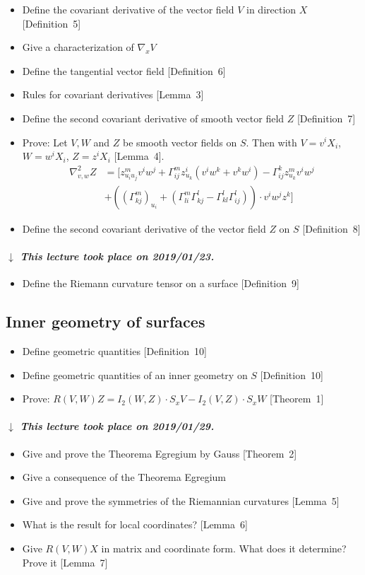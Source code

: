 \documentclass{article}
\numberwithin{lecref}{section}
\newcommand{\dateref}[1]{%
  \begin{mdframed}[backgroundcolor=gray!10,innerbottommargin=0pt,innertopmargin=0pt]
    \paragraph{\textit{$\downarrow$ This lecture took place on #1.}}%
  \end{mdframed}%
}
\begin{document}
\begin{itemize}
  \item Define the covariant derivative of the vector field $V$ in direction $X$ [Definition~5]
  \item Give a characterization of $\nabla_x V$
  \item Define the tangential vector field [Definition~6]
  \item Rules for covariant derivatives [Lemma~3]
  \item Define the second covariant derivative of smooth vector field $Z$ [Definition~7]
  \item Prove: Let $V, W$ and $Z$ be smooth vector fields on $S$. Then with $V = v^i X_i$, $W = w^i X_i$, $Z = z^i X_i$ [Lemma~4].
    \begin{align*}
      \nabla_{v,w}^2 Z &= \big[z_{u_i u_j}^m v^i w^j + \Gamma_{ij}^m z_{u_k}^i (v^i w^k + v^k w^i) - \Gamma_{ij}^k z_{u_k}^m v^i w^j \\
        &+ \left((\Gamma_{kj}^m)_{u_i} + (\Gamma_{li}^m \Gamma_{kj}^l - \Gamma_{kl}^l \Gamma_{ij}^l)\right) \cdot v^i w^j z^k \big]
    \end{align*}
  \item Define the second covariant derivative of the vector field $Z$ on $S$ [Definition~8]
\end{itemize}

\dateref{2019/01/23}

\begin{itemize}
  \item Define the Riemann curvature tensor on a surface [Definition~9] \\
\end{itemize}

\subsection*{Inner geometry of surfaces}

\begin{itemize}
  \item Define geometric quantities [Definition~10]
  \item Define geometric quantities of an inner geometry on $S$ [Definition~10]
  \item Prove: $R(V, W) Z = I_2(W, Z) \cdot S_x V - I_2(V, Z) \cdot S_x W$ [Theorem~1]
\end{itemize}

\dateref{2019/01/29}

\begin{itemize}
  \item Give and prove the Theorema Egregium by Gauss [Theorem~2]
  \item Give a consequence of the Theorema Egregium
  \item Give and prove the symmetries of the Riemannian curvatures [Lemma~5]
  \item What is the result for local coordinates? [Lemma~6]
  \item Give $R(V, W) X$ in matrix and coordinate form. What does it determine? Prove it [Lemma~7]
\end{itemize}
\end{document}
